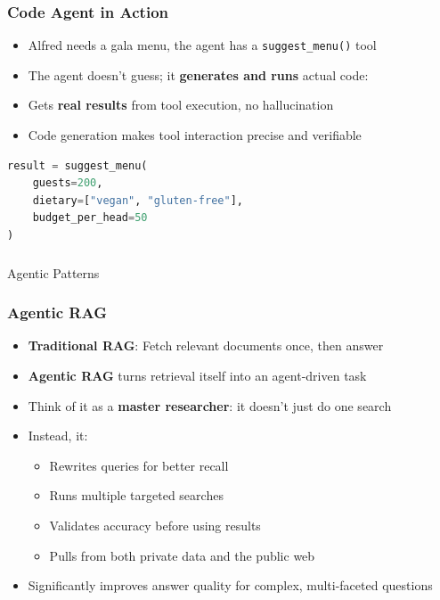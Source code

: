 \begin{frame}[fragile]\frametitle{Code Agent in Action}
      \begin{itemize}
        \item Alfred needs a gala menu, the agent has a \texttt{suggest\_menu()} tool
        \item The agent doesn't guess; it \textbf{generates and runs} actual code:
        \item Gets \textbf{real results} from tool execution, no hallucination
        \item Code generation makes tool interaction precise and verifiable
      \end{itemize}
	  
\begin{lstlisting}[language=Python, basicstyle=\small\ttfamily]
result = suggest_menu(
    guests=200,
    dietary=["vegan", "gluten-free"],
    budget_per_head=50
)
\end{lstlisting}	  
\end{frame}


\begin{frame}[fragile]\frametitle{}
\begin{center}
{\Large Agentic Patterns}

\end{center}
\end{frame}

\begin{frame}[fragile]\frametitle{Agentic RAG}
      \begin{itemize}
        \item \textbf{Traditional RAG}: Fetch relevant documents once, then answer
        \item \textbf{Agentic RAG} turns retrieval itself into an agent-driven task
        \item Think of it as a \textbf{master researcher}: it doesn't just do one search
        \item Instead, it:
        \begin{itemize}
            \item Rewrites queries for better recall
            \item Runs multiple targeted searches
            \item Validates accuracy before using results
            \item Pulls from both private data and the public web
        \end{itemize}
        \item Significantly improves answer quality for complex, multi-faceted questions
      \end{itemize}
\end{frame}

